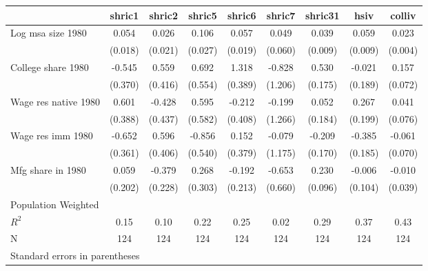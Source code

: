 \begin{tabular}{l*{8}{c}}
\toprule
                &\multicolumn{1}{c}{shric1}&\multicolumn{1}{c}{shric2}&\multicolumn{1}{c}{shric5}&\multicolumn{1}{c}{shric6}&\multicolumn{1}{c}{shric7}&\multicolumn{1}{c}{shric31}&\multicolumn{1}{c}{hsiv}&\multicolumn{1}{c}{colliv}\\
\midrule
Log msa size 1980&    0.054&    0.026&    0.106&    0.057&    0.049&    0.039&    0.059&    0.023\\
                &  (0.018)&  (0.021)&  (0.027)&  (0.019)&  (0.060)&  (0.009)&  (0.009)&  (0.004)\\
College share 1980&   -0.545&    0.559&    0.692&    1.318&   -0.828&    0.530&   -0.021&    0.157\\
                &  (0.370)&  (0.416)&  (0.554)&  (0.389)&  (1.206)&  (0.175)&  (0.189)&  (0.072)\\
Wage res native 1980&    0.601&   -0.428&    0.595&   -0.212&   -0.199&    0.052&    0.267&    0.041\\
                &  (0.388)&  (0.437)&  (0.582)&  (0.408)&  (1.266)&  (0.184)&  (0.199)&  (0.076)\\
Wage res imm 1980&   -0.652&    0.596&   -0.856&    0.152&   -0.079&   -0.209&   -0.385&   -0.061\\
                &  (0.361)&  (0.406)&  (0.540)&  (0.379)&  (1.175)&  (0.170)&  (0.185)&  (0.070)\\
Mfg share in 1980&    0.059&   -0.379&    0.268&   -0.192&   -0.653&    0.230&   -0.006&   -0.010\\
                &  (0.202)&  (0.228)&  (0.303)&  (0.213)&  (0.660)&  (0.096)&  (0.104)&  (0.039)\\
\midrule
Population Weighted&         &         &         &         &         &         &         &         \\
$ R^2$          &     0.15&     0.10&     0.22&     0.25&     0.02&     0.29&     0.37&     0.43\\
N               &      124&      124&      124&      124&      124&      124&      124&      124\\
\bottomrule
\multicolumn{9}{l}{\footnotesize Standard errors in parentheses}\\
\end{tabular}
